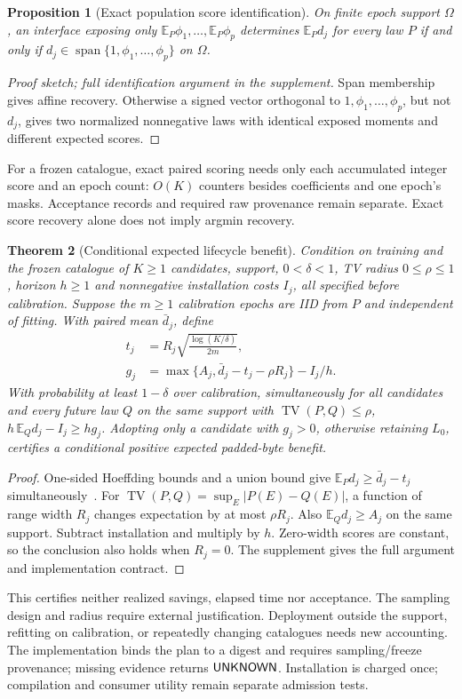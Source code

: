 \documentclass[10pt,journal,compsoc]{IEEEtran}
\newtheorem{theorem}{Theorem}
\newtheorem{proposition}[theorem]{Proposition}
\theoremstyle{definition}\newtheorem{definition}[theorem]{Definition}
\newcommand{\E}{\mathbb E}\newcommand{\ind}{\mathbf 1}
\begin{document}
\begin{proposition}[Exact population score identification]\label{prop:summary-span}
On finite epoch support $\Omega$, an interface exposing only
$\E_P\phi_1,\ldots,\E_P\phi_p$ determines $\E_Pd_j$ for every law $P$
if and only if $d_j\in\operatorname{span}\{1,\phi_1,\ldots,\phi_p\}$
on $\Omega$.
\end{proposition}
\begin{proof}[Proof sketch; full identification argument in the supplement]
Span membership gives affine recovery. Otherwise a signed vector
orthogonal to $1,\phi_1,\ldots,\phi_p$, but not $d_j$, gives two
normalized nonnegative laws with identical exposed moments and different
expected scores.
\end{proof}
For a frozen catalogue, exact paired scoring needs only each accumulated
integer score and an epoch count: $O(K)$ counters besides coefficients
and one epoch's masks. Acceptance records and required raw provenance
remain separate. Exact score recovery alone does not imply argmin recovery.

\begin{theorem}[Conditional expected lifecycle benefit]\label{thm:adoption}
Condition on training and the frozen catalogue of $K\ge1$ candidates,
support, $0<\delta<1$, TV radius $0\le\rho\le1$, horizon $h\ge1$ and
nonnegative installation costs $I_j$, all specified before calibration.
Suppose the $m\ge1$ calibration epochs are IID from $P$ and independent
of fitting. With paired mean $\bar d_j$, define
\begin{align}
t_j&=R_j\sqrt{\frac{\log(K/\delta)}{2m}},\nonumber\\
g_j&=\max\{A_j,\bar d_j-t_j-\rho R_j\}-I_j/h.
\label{eq:adoption-lower}
\end{align}
With probability at least $1-\delta$ over calibration, simultaneously
for all candidates and every future law $Q$ on the same support with
$\operatorname{TV}(P,Q)\le\rho$, $h\,\E_Qd_j-I_j\ge h g_j$.
Adopting only a candidate with $g_j>0$, otherwise retaining $L_0$,
certifies a conditional positive expected padded-byte benefit.
\end{theorem}
\begin{proof}
One-sided Hoeffding bounds and a union bound give
$\E_Pd_j\ge\bar d_j-t_j$ simultaneously~\cite{hoeffding,learntest}.
For $\operatorname{TV}(P,Q)=\sup_E|P(E)-Q(E)|$,
a function of range width $R_j$ changes expectation by at most
$\rho R_j$. Also $\E_Qd_j\ge A_j$ on the same support.
Subtract installation and multiply by $h$. Zero-width scores are
constant, so the conclusion also holds when $R_j=0$.
The supplement gives the full argument and implementation contract.
\end{proof}
This certifies neither realized savings, elapsed time nor acceptance.
The sampling design and radius require external justification. Deployment
outside the support, refitting on calibration, or repeatedly changing
catalogues needs new accounting. The implementation binds the plan to a
digest and requires sampling/freeze provenance; missing evidence returns
$\mathsf{UNKNOWN}$. Installation is charged once; compilation and consumer
utility remain separate admission tests.
\end{document}
